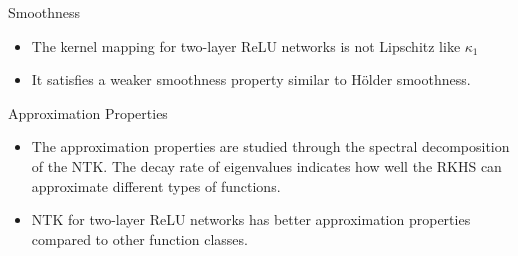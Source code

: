 \documentclass{beamer}
\begin{document}




\begin{frame}
\begin{block}{Smoothness}
    \begin{itemize}
        \item The kernel mapping for two-layer ReLU networks is not Lipschitz like $\kappa_1$
        \item It satisfies a weaker smoothness property similar to Hölder smoothness.
    \end{itemize}
\end{block}

\begin{block}{Approximation Properties}
    \begin{itemize}
        \item The approximation properties are studied through the spectral decomposition of the NTK. The decay rate of eigenvalues indicates how well the RKHS can approximate different types of functions.
        \item NTK for two-layer ReLU networks has better approximation properties compared to other function classes.
    \end{itemize}
\end{block}
\end{frame}
\end{document}
